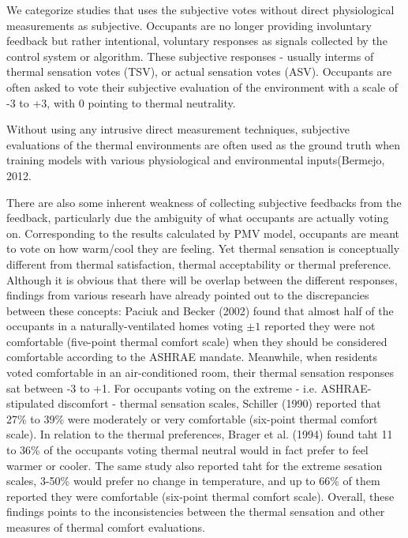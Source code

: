 
We categorize studies that uses the subjective votes without direct physiological measurements as subjective. Occupants are no longer providing involuntary feedback but rather intentional, voluntary responses as signals collected by the control system or algorithm. These subjective responses - usually interms of thermal sensation votes (TSV), or actual sensation votes (ASV). Occupants are often asked to vote their subjective evaluation of the environment with a scale of -3 to +3, with 0 pointing to thermal neutrality. 

Without using any intrusive direct measurement techniques, subjective evaluations of the thermal environments are often used as the ground truth when training models with various physiological and environmental inputs(Bermejo, 2012. 

There are also some inherent weakness of collecting subjective feedbacks from the feedback, particularly due the ambiguity of what occupants are actually voting on. Corresponding to the results calculated by PMV model, occupants are meant to vote on how warm/cool they are feeling. Yet thermal sensation is conceptually different from thermal satisfaction, thermal acceptability or thermal preference\cite{charles_fangers_2003}. Although it is obvious that there will be overlap between the different responses, findings from various researh have already pointed out to the discrepancies between these concepts: Paciuk and Becker (2002) found that almost half of the occupants in a naturally-ventilated homes voting $\pm1$ reported they were not comfortable (five-point thermal comfort scale) when they should be considered comfortable according to the ASHRAE mandate. Meanwhile, when residents voted comfortable in an air-conditioned room, their thermal sensation responses sat between -3 to +1. For occupants voting on the extreme - i.e. ASHRAE-stipulated discomfort - thermal sensation scales, Schiller (1990) reported that 27\% to 39\% were moderately or very comfortable (six-point thermal comfort scale). In relation to the thermal preferences, Brager et al. (1994) found taht 11 to 36\% of the occupants voting thermal neutral would in fact prefer to feel warmer or cooler. The same study also reported taht for the extreme sesation scales, 3-50\% would prefer no change in temperature, and up to 66\% of them reported they were comfortable (six-point thermal comfort scale). Overall, these findings points to the inconsistencies between the thermal sensation and other measures of thermal comfort evaluations. 

